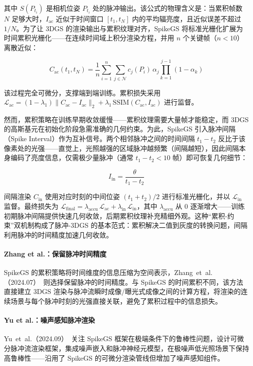 其中 $S(P_{t_i})$ 是相机位姿 $P_{t_i}$ 处的脉冲输出。该公式的物理含义是：当累积帧数 $N$ 足够大时，$I_{\mathrm{ac}}$ 近似于时间窗口 $[t_1, t_N]$ 内的平均辐亮度，且近似误差不超过 $1/N$。为了让 3DGS 的渲染输出与累积纹理对齐，SpikeGS 将标准光栅化扩展为时间累积光栅化——在连续时间域上积分渲染方程，并用 $n$ 个关键帧（$n < 10$）离散近似：

\begin{equation}
C_{\mathrm{ac}}(t_1, t_N) = \frac{1}{n} \sum_{i=1}^{n} \sum_{j \in \mathcal{N}} c_j(P_i)\,\alpha_j \prod_{k=1}^{j-1}(1-\alpha_k)
\end{equation}

该过程完全可微分，支撑端到端训练。累积损失采用 $\mathcal{L}_{\mathrm{ac}} = (1-\lambda_1)\|C_{\mathrm{ac}} - I_{\mathrm{ac}}\|_2 + \lambda_1\,\mathrm{SSIM}(C_{\mathrm{ac}}, I_{\mathrm{ac}})$ 进行监督。

然而，累积策略在训练早期收敛缓慢——累积纹理需要大量帧才能稳定，而 3DGS 的高斯基元在初始化阶段急需准确的几何约束。为此，SpikeGS 引入脉冲间隔（Spike Interval）作为互补信号。两个相邻脉冲之间的时间间隔 $t_1 - t_2$ 反比于该像素处的光强——直觉上，光照越强的区域脉冲越频繁（间隔越短），因此间隔本身编码了亮度信息，仅需极少量脉冲（通常 $t_1 - t_2 < 10$ 帧）即可恢复几何细节：

\begin{equation}
I_{\mathrm{in}} = \frac{\theta}{t_1 - t_2}
\end{equation}

间隔渲染 $C_{\mathrm{in}}$ 使用对应时刻的中间位姿 $(t_1+t_2)/2$ 进行标准光栅化，并以 $\mathcal{L}_{\mathrm{in}}$ 监督。最终损失为 $\mathcal{L}_{\mathrm{final}} = \lambda_{\mathrm{accu}}\,\mathcal{L}_{\mathrm{ac}} + \lambda_{\mathrm{in}}\,\mathcal{L}_{\mathrm{in}}$，其中 $\lambda_{\mathrm{accu}}$ 从 0 逐渐增大——训练初期脉冲间隔提供快速几何收敛，后期累积纹理补充精细外观。这种“累积-约束”双机制构成了脉冲-3DGS 的基本范式：累积解决二值到灰度的转换问题，间隔利用脉冲的时间精度加速几何收敛。

\paragraph{Zhang et al.：保留脉冲时间精度}
SpikeGS 的累积策略将时间维度的信息压缩为空间表示，Zhang~et~al.（2024.07）~\cite{2407_10062}则选择保留脉冲的时间精度。与 SpikeGS 的时间累积不同，该方法直接建立 3DGS 渲染与脉冲流瞬时成像/曝光式成像之间的计算方程，将渲染的连续场景与每个脉冲时刻的光强直接关联，避免了累积过程中的信息损失。

\paragraph{Yu et al.：噪声感知脉冲渲染}
Yu~et~al.（2024.09）~\cite{2409_15176}关注 SpikeGS 框架在极端条件下的鲁棒性问题，设计可微分脉冲流渲染框架，集成噪声嵌入和脉冲神经元模型，在极噪声低光照场景下保持高鲁棒性——沿用了 SpikeGS 的可微分渲染管线但增加了噪声感知组件。

